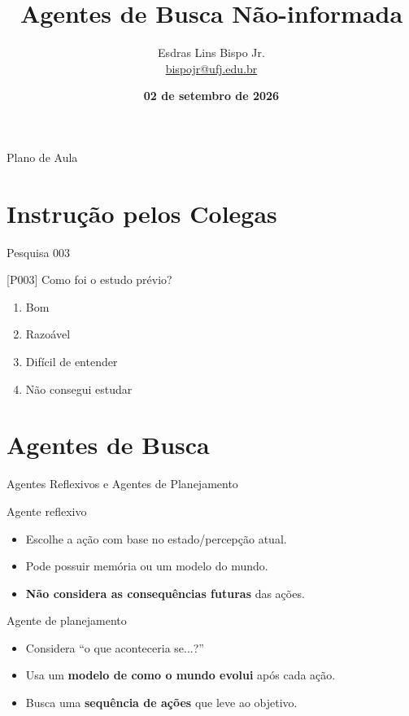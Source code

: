 \documentclass[xcolor=dvipsnames,table]{beamer}
\title{Agentes de Busca Não-informada}
\author{
  Esdras Lins Bispo Jr. \\ \url{bispojr@ufj.edu.br}
  }
\institute{
  Inteligência Artificial \\Bacharelado em Ciência da Computação}
\date{\textbf{02 de setembro de 2026} }
\begin{document}
	\begin{frame}
		\titlepage
	\end{frame}

	\AtBeginSection{
		\begin{frame}{Sumário}%
    		\tableofcontents[currentsection]
		\end{frame}
	}

	\begin{frame}{Plano de Aula}
		\tableofcontents
	\end{frame}
	
	\section{Instrução pelos Colegas}
	

    \begin{frame}{Pesquisa 003}
		\begin{block}{[P003]}
			Como foi o estudo prévio?
		\end{block}
		\begin{enumerate}[label=(\Alph*)]
			\item Bom
			\item Razoável
			\item Difícil de entender
			\item Não consegui estudar
		\end{enumerate}
	\end{frame}

    \section{Agentes de Busca}
	\begin{frame}{Agentes Reflexivos e Agentes de Planejamento}
    \begin{block}{Agente reflexivo}
        \begin{itemize}
            \item Escolhe a ação com base no estado/percepção atual.
            \item Pode possuir memória ou um modelo do mundo.
            \item \textbf{Não considera as consequências futuras} das ações.
        \end{itemize}
    \end{block}

    \begin{block}{Agente de planejamento}
        \begin{itemize}
            \item Considera ``o que aconteceria se...?''
            \item Usa um \textbf{modelo de como o mundo evolui} após cada ação.
            \item Busca uma \textbf{sequência de ações} que leve ao objetivo.
        \end{itemize}
    \end{block}
\end{frame}
\end{document}
